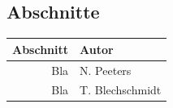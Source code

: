 \documentclass[a4paper]{article}
\begin{document}
        \clearpage
        \nocite{*}
        
        
        
        \clearpage
        
        \subsection{Abschnitte}
            \begin{tabular}{rl}
              Abschnitt & Autor \\
              \hline
              Bla & N. Peeters\\
              Bla & T. Blechschmidt
            \end{tabular}
        
%                
\end{document}
